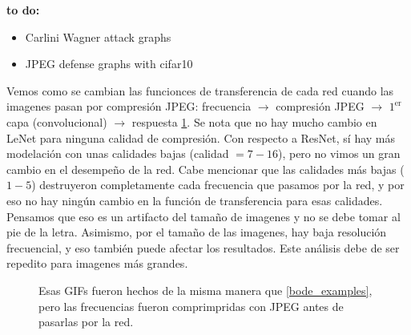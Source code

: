 {\LARGE \textbf{to do:}}
\begin{itemize}
    \item Carlini Wagner attack graphs
    \item JPEG defense graphs with cifar10    
\end{itemize}
Vemos como se cambian las funcionces de transferencia de cada red cuando las imagenes pasan por compresión JPEG: frecuencia $\to$ compresión JPEG $\to$ $1^\text{er}$ capa (convolucional) $\to$ respuesta \ref{bode_gifs}. Se nota que no hay mucho cambio en LeNet para ninguna calidad de compresión. Con respecto a ResNet, sí hay más modelación con unas calidades bajas (calidad $= 7-16$), pero no vimos un gran cambio en el desempeño de la red. Cabe mencionar que las calidades más bajas ($1-5$) destruyeron completamente cada frecuencia que pasamos por la red, y por eso no hay ningún cambio en la función de transferencia para esas calidades. Pensamos que eso es un artifacto del tamaño de imagenes y no se debe tomar al pie de la letra. Asimismo, por el tamaño de las imagenes, hay baja resolución frecuencial, y eso también puede afectar los resultados. Este análisis debe de ser repedito para imagenes más grandes.
\begin{figure}[h]
    \caption{Esas GIFs fueron hechos de la misma manera que \ref{bode_examples}, pero las frecuencias fueron comprimpridas con JPEG antes de pasarlas por la red. }
    \label{bode_gifs}
\end{figure}



